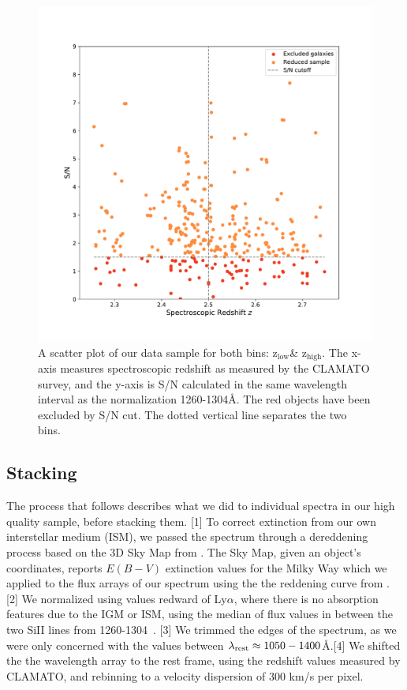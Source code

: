 \documentclass[preprint2,times,tighten]{aastex6}
\newcommand{\lya}{Ly$\alpha$\space}
\newcommand{\hiz}{$\mathrm{z_{high}}$\space}
\newcommand{\loz}{$\mathrm{z_{low}}$\space}
\begin{document}
\begin{figure}[ht]
    \begin{center}
    \includegraphics[width=\columnwidth]{noise_scatter.pdf}
    \caption{A scatter plot of our data sample for both bins: \loz \& \hiz. The x-axis measures spectroscopic redshift as measured by the CLAMATO survey, and the y-axis is S/N calculated in the same wavelength interval as the normalization 1260-1304\AA \citep{faucher-giguere_direct_2008}. The red objects have been excluded by S/N cut. The dotted vertical line separates the two bins.}
    \label{fig:noise_scatter}
    \end{center}
\end{figure}


\subsection{Stacking}
\label{subsec:stack}

The process that follows describes what we did to individual spectra in our high quality sample, before stacking them. [1] To correct extinction from our own interstellar medium (ISM), we passed the spectrum through a dereddening process based on the 3D Sky Map from \cite{2018MNRAS.478..651G}. The Sky Map, given an object's coordinates, reports $E(B-V)$ extinction values for the Milky Way which we applied to the flux arrays of our spectrum using the the reddening curve from \cite{calzetti_dust_2000}. [2] We normalized using values redward of \lya, where there is no absorption features due to the IGM or ISM, using the median of flux values in between the two SiII lines from 1260-1304\ \citep{faucher-giguere_direct_2008}. [3] We trimmed the edges of the spectrum, as we were only concerned with the values between $\lambda_{\rm rest} \approx 1050-1400$\AA.[4] We shifted the the wavelength array to the rest frame, using the redshift values measured by CLAMATO, and rebinning to a velocity dispersion of 300 km/s per pixel.
\end{document}
